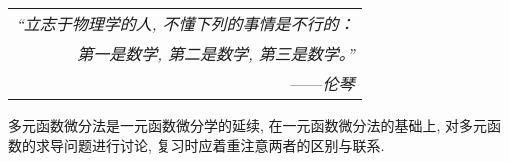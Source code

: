 \begin{flushright}
    \begin{tabular}{r|}
        \textit{“立志于物理学的人, 不懂下列的事情是不行的：}\\
        \textit{第一是数学, 第二是数学, 第三是数学。”}\\
        ——\textit{伦琴}
    \end{tabular}
\end{flushright}

多元函数微分法是一元函数微分学的延续, 在一元函数微分法的基础上, 对多元函数的求导问题进行讨论, 
复习时应着重注意两者的区别与联系.